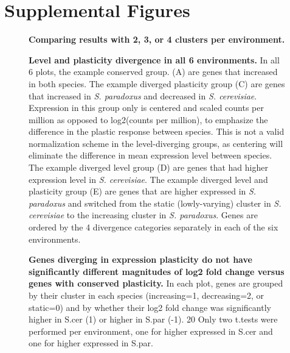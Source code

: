 \clearpage
\section{Supplemental Figures}
\setcounter{figure}{0}
\captionsetup[figure]{labelformat=withS}

\begin{figure}[H]
    \centering
    \caption{\textbf{Comparing results with 2, 3, or 4 clusters per environment.}}
    \label{fig:qc_clusters}
\end{figure}

\begin{figure}
    \centering
    \label{fig:all_environments}
\end{figure}

\begin{figure}
    \centering
    \caption{\textbf{Level and plasticity divergence in all 6 environments. }In all 6 plots, the example conserved group. (A) are genes that increased in both species. The example diverged plasticity group (C) are genes that increased in \textit{S. paradoxus} and decreased in \textit{S. cerevisiae}. Expression in this group only is centered and scaled counts per million as opposed to log2(counts per million), to emphasize the difference in the plastic response between species. This is not a valid normalization scheme in the level-diverging groups, as centering will eliminate the difference in mean expression level between species. The example diverged level group (D) are genes that had higher expression level in \textit{S. cerevisiae}. The example diverged level and plasticity group (E) are genes that are higher expressed in \textit{S. paradoxus} and switched from the static (lowly-varying) cluster in \textit{S. cerevisiae} to the increasing cluster in \textit{S. paradoxus}. Genes are ordered by the 4 divergence categories separately in each of the six environments.}
    \label{fig:all_environments}
\end{figure}

\begin{figure}
    \centering
    \caption{\textbf{Genes diverging in expression plasticity do not have significantly different magnitudes of log2 fold change versus genes with conserved plasticity.} In each plot, genes are grouped by their cluster in each species (increasing=1, decreasing=2, or static=0) and by whether their log2 fold change was significantly higher in S.cer (1) or higher in S.par (-1). 20
Only two t.tests were performed per environment, one for higher expressed in S.cer and one for higher expressed in S.par.}
    \label{fig:boxplots}
\end{figure}

